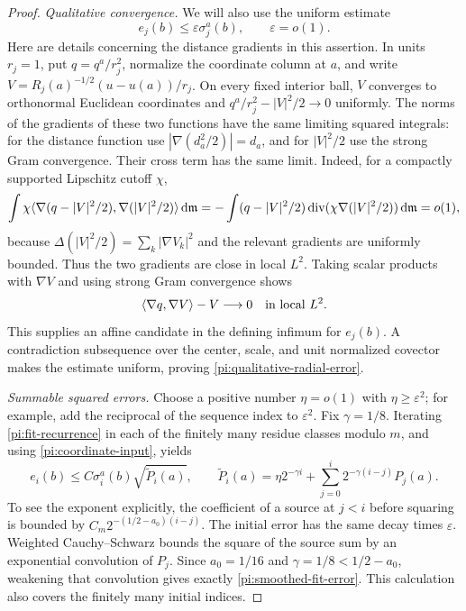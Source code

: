 \begin{proof}
\smallskip\noindent
\emph{Qualitative convergence.}
We will also use the uniform estimate
\begin{equation}
 e_j(b)\le\varepsilon\sigma_j^a(b),\qquad\varepsilon=o(1).
 \label{pi:qualitative-radial-error}
\end{equation}
Here are details concerning the distance gradients in this assertion.
In units $r_j=1$, put $q=q^a/r_j^2$, normalize the coordinate
column at $a$, and write
$V=R_j(a)^{-1/2}(u-u(a))/r_j$.  On every fixed interior ball,
$V$ converges to orthonormal Euclidean coordinates and
$q^a/r_j^2-|V|^2/2\to0$ uniformly.  The norms of the gradients
of these two functions have the same limiting squared integrals:
for the distance function use $|\nabla(d_a^2/2)|=d_a$, and for
$|V|^2/2$ use the strong Gram convergence.  Their cross term has
the same limit.  Indeed, for a compactly supported Lipschitz cutoff
$\chi$,
\[
 \int\chi\langle\nabla(q-|V|^2/2),\nabla(|V|^2/2)\rangle\,\mathrm d\mathfrak m
 =-\int(q-|V|^2/2)
       \operatorname{div}(\chi\nabla(|V|^2/2))\,\mathrm d\mathfrak m=o(1),
\]
because $\Delta(|V|^2/2)=\sum_k|\nabla V_k|^2$ and the relevant
gradients are uniformly bounded.  Thus the two gradients are
close in local $L^2$.  Taking scalar products with $\nabla V$
and using strong Gram convergence shows
\[
 \langle\nabla q,\nabla V\rangle-V\longrightarrow0
 \quad\hbox{in local }L^2.
\]
This supplies an affine candidate in the defining infimum for
$e_j(b)$.  A contradiction subsequence over the center, scale,
and unit normalized covector makes the estimate uniform, proving
\eqref{pi:qualitative-radial-error}.

\smallskip\noindent
\emph{Summable squared errors.}
Choose a positive number $\eta=o(1)$ with $\eta\ge\varepsilon^2$;
for example, add the reciprocal of the sequence index to
$\varepsilon^2$.  Fix $\gamma=1/8$.  Iterating
\eqref{pi:fit-recurrence} in each of the finitely many residue
classes modulo $m$, and using \eqref{pi:coordinate-input}, yields
\begin{equation}
 e_i(b)\le C\sigma_i^a(b)\sqrt{\widetilde P_i(a)},\qquad
 \widetilde P_i(a)=\eta2^{-\gamma i}
          +\sum_{j=0}^i2^{-\gamma(i-j)}P_j(a).
 \label{pi:smoothed-fit-error}
\end{equation}
To see the exponent explicitly, the coefficient of a source at
$j<i$ before squaring is bounded by
$C_m2^{-(1/2-a_0)(i-j)}$.  The initial error has the same
decay times $\varepsilon$.  Weighted Cauchy--Schwarz bounds the
square of the source sum by an exponential convolution of $P_j$.
Since $a_0=1/16$ and $\gamma=1/8<1/2-a_0$, weakening that
convolution gives exactly \eqref{pi:smoothed-fit-error}.  This
calculation also covers the finitely many initial indices.


\end{proof}
